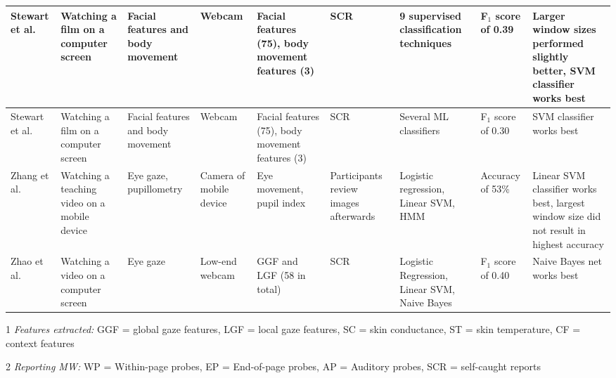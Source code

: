 \begin{xtabular}{p{25mm}p{30mm}p{30mm}p{33mm}p{22mm}p{22mm}p{33mm}p{27mm}p{35mm}}
Stewart et al. \cite{Stewart2017FaceComprehension} & Watching a film on a computer screen & Facial features and body movement & Webcam & Facial features (75), body movement features (3) & SCR & 9 supervised classification techniques & F$_1$ score of 0.39 & Larger window sizes performed slightly better, SVM classifier works best\\ \midrule
Stewart et al. \cite{Stewart2016WheresViewing} & Watching a film on a computer screen & Facial features and body movement & Webcam & Facial features (75), body movement features (3) & SCR & Several ML classifiers & F$_1$ score of 0.30 & SVM classifier works best\\ \midrule
Zhang et al. \cite{ISI:000443429900018} & Watching a teaching video on a mobile device & Eye gaze, pupillometry & Camera of mobile device & Eye movement, pupil index & Participants review images afterwards & Logistic regression, Linear SVM, HMM & Accuracy of 53\% & Linear SVM classifier works best, largest window size did not result in highest accuracy\\ \midrule
Zhao et al. \cite{Zhao2017ScalableApproach} & Watching a video on a computer screen & Eye gaze & Low-end webcam & GGF and LGF (58 in total) & SCR & Logistic Regression, Linear SVM, Naive Bayes & F$_1$ score of 0.40 & Naive Bayes net works best\\ \midrule
\bottomrule
\end{xtabular}
\begin{ThreePartTable}
        \begin{tablenotes}
        \small
        \item[1] \emph{Features extracted:} GGF = global gaze features, LGF = local gaze features, SC = skin conductance, ST = skin temperature, CF = context features
        \item[2] \emph{Reporting MW:} WP = Within-page probes, EP = End-of-page probes, AP = Auditory probes, SCR = self-caught reports
        \end{tablenotes}
\end{ThreePartTable}
\restoregeometry %
\twocolumn       %
